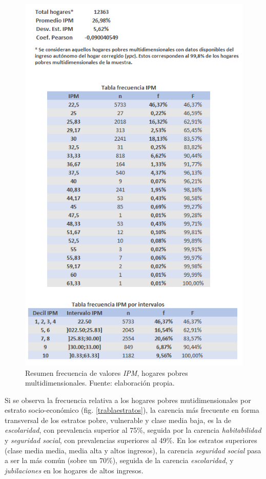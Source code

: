 \documentclass[12pt,letterpaper,spanish]{article}
\begin{document}
\begin{figure}[!]
    \centering
    \includegraphics[height=\textheight]{Max/resumen_frecuencias_IPM.png}
    \caption{Resumen frecuencia de valores \textit{IPM}, hogares pobres multidimensionales. Fuente: elaboración propia.}
    \label{res_frec}
\end{figure}





Si se observa la frecuencia relativa a los hogares pobres mutidimensionales por estrato socio-económico (fig. \ref{trablaestratos}), la carencia más frecuente en forma transversal de los estratos pobre, vulnerable y clase media baja, es la de \textit{escolaridad}, con prevalencia superior al 75\%, seguida por la carencia \textit{habitabilidad} y \textit{seguridad social}, con prevalencias superiores al 49\%. En los estratos superiores (clase media media, media alta y altos ingresos), la carencia \textit{seguridad social} pasa a ser la más común (sobre un 70\%), seguida de la carencia \textit{escolaridad},  y \textit{jubilaciones} en los hogares de altos ingresos.
\end{document}
